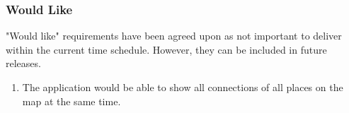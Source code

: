 \subsubsection {Would Like}
"Would like" requirements have been agreed upon as not important to deliver within the current time schedule. However, they can be included in future releases.

\begin{enumerate}
    \item The application would be able to show all connections of all places on the map at the same time.
\end{enumerate}

 
\begin{comment}
\begin{enumerate}
    \item{General} 
    \begin{enumerate}
        \item 
    
        \item A user must be able to input city names.
        \item Relationships that are found in the system must be grouped.
        \item A user must be able to zoom on found relations in order to get more details about the relations.
    \end{enumerate}
    
    \item{Search Engine} 
    \begin{enumerate}
        \item All data from a search engine should be gathered.
        \item From this data only the data containing 2 or more city names should be kept and stored.
    \end{enumerate}
    
    \item{Filtering} 
    \begin{enumerate}
        \item This data should t
        
        \item Logic Filters 
        \item Relations Filters
    \end{enumerate}
    
    \item{Machine Learning} 
    \begin{enumerate}
        \item
    

\end{comment}
